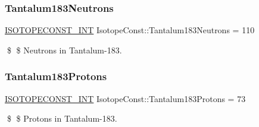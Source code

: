 \subsubsection{\texorpdfstring{Tantalum183\+Neutrons}{Tantalum183Neutrons}}
{\footnotesize\ttfamily \mbox{\hyperlink{group___isotope_const-_macros_ga5f18360b3e99483a35c32d789e62621c}{I\+S\+O\+T\+O\+P\+E\+C\+O\+N\+S\+T\+\_\+\+I\+NT}} Isotope\+Const\+::\+Tantalum183\+Neutrons = 110}

\$ \$ Neutrons in Tantalum-\/183. \mbox{\label{group___isotope_const-_tantalum-_ta183_gab05377fd925254fa197d9aff8fe14225}} 
\subsubsection{\texorpdfstring{Tantalum183\+Protons}{Tantalum183Protons}}
{\footnotesize\ttfamily \mbox{\hyperlink{group___isotope_const-_macros_ga5f18360b3e99483a35c32d789e62621c}{I\+S\+O\+T\+O\+P\+E\+C\+O\+N\+S\+T\+\_\+\+I\+NT}} Isotope\+Const\+::\+Tantalum183\+Protons = 73}

\$ \$ Protons in Tantalum-\/183. 